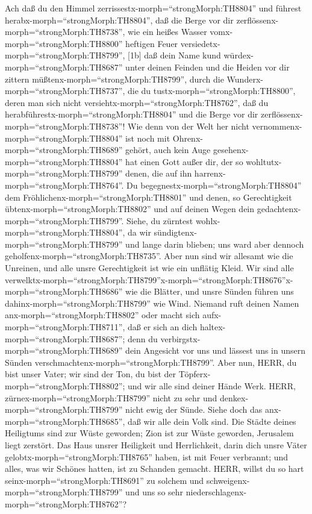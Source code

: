  Ach daß du den Himmel
zerrissestx-morph=``strongMorph:TH8804'' und führest
herabx-morph=``strongMorph:TH8804'', daß die Berge vor dir
zerflössenx-morph=``strongMorph:TH8738'', wie ein heißes Wasser
vomx-morph=``strongMorph:TH8800'' heftigen Feuer
versiedetx-morph=``strongMorph:TH8799'',  {[}1b{]} daß dein
Name kund würdex-morph=``strongMorph:TH8687'' unter deinen Feinden und
die Heiden vor dir zittern müßtenx-morph=``strongMorph:TH8799'',
 durch die Wunderx-morph=``strongMorph:TH8737'', die du
tustx-morph=``strongMorph:TH8800'', deren man sich nicht
versiehtx-morph=``strongMorph:TH8762'', daß du
herabführestx-morph=``strongMorph:TH8804'' und die Berge vor dir
zerflössenx-morph=``strongMorph:TH8738''!  Wie denn von der
Welt her nicht vernommenx-morph=``strongMorph:TH8804'' ist noch mit
Ohrenx-morph=``strongMorph:TH8689'' gehört, auch kein Auge
gesehenx-morph=``strongMorph:TH8804'' hat einen Gott außer dir, der so
wohltutx-morph=``strongMorph:TH8799'' denen, die auf ihn
harrenx-morph=``strongMorph:TH8764''.  Du
begegnestx-morph=``strongMorph:TH8804'' dem
Fröhlichenx-morph=``strongMorph:TH8801'' und denen, so Gerechtigkeit
übtenx-morph=``strongMorph:TH8802'' und auf deinen Wegen dein
gedachtenx-morph=``strongMorph:TH8799''. Siehe, du zürntest
wohlx-morph=``strongMorph:TH8804'', da wir
sündigtenx-morph=``strongMorph:TH8799'' und lange darin blieben; uns
ward aber dennoch geholfenx-morph=``strongMorph:TH8735''. 
Aber nun sind wir allesamt wie die Unreinen, und alle unsre
Gerechtigkeit ist wie ein unflätig Kleid. Wir sind alle
verwelktx-morph=``strongMorph:TH8799''\textbar x-morph=``strongMorph:TH8676''x-morph=``strongMorph:TH8686''
wie die Blätter, und unsre Sünden führen uns
dahinx-morph=``strongMorph:TH8799'' wie Wind.  Niemand ruft
deinen Namen anx-morph=``strongMorph:TH8802'' oder macht sich
aufx-morph=``strongMorph:TH8711'', daß er sich an dich
haltex-morph=``strongMorph:TH8687''; denn du
verbirgstx-morph=``strongMorph:TH8689'' dein Angesicht vor uns und
lässest uns in unsern Sünden
verschmachtenx-morph=``strongMorph:TH8799''.  Aber nun,
HERR, du bist unser Vater; wir sind der Ton, du bist der
Töpferx-morph=``strongMorph:TH8802''; und wir alle sind deiner Hände
Werk.  HERR, zürnex-morph=``strongMorph:TH8799'' nicht zu
sehr und denkex-morph=``strongMorph:TH8799'' nicht ewig der Sünde. Siehe
doch das anx-morph=``strongMorph:TH8685'', daß wir alle dein Volk sind.
 Die Städte deines Heiligtums sind zur Wüste geworden; Zion
ist zur Wüste geworden, Jerusalem liegt zerstört.  Das Haus
unsrer Heiligkeit und Herrlichkeit, darin dich unsre Väter
gelobtx-morph=``strongMorph:TH8765'' haben, ist mit Feuer verbrannt; und
alles, was wir Schönes hatten, ist zu Schanden gemacht. 
HERR, willst du so hart seinx-morph=``strongMorph:TH8691'' zu solchem
und schweigenx-morph=``strongMorph:TH8799'' und uns so sehr
niederschlagenx-morph=``strongMorph:TH8762''?


